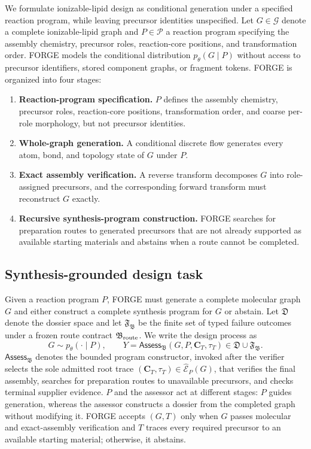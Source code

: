 \documentclass{article}
\begin{document}
We formulate ionizable-lipid design as conditional generation under a specified reaction program,
while leaving precursor identities unspecified.
Let $G\in\mathcal{G}$ denote a complete ionizable-lipid graph and $P\in\mathcal{P}$ a reaction
program specifying the assembly chemistry, precursor roles, reaction-core positions, and
transformation order.
FORGE models the conditional distribution $p_\theta(G\mid P)$ without access to precursor
identifiers, stored component graphs, or fragment tokens.
FORGE is organized into four stages:
\begin{enumerate}
    \item \textbf{Reaction-program specification.}
    $P$ defines the assembly chemistry, precursor roles, reaction-core positions, transformation
    order, and coarse per-role morphology, but not precursor identities.

    \item \textbf{Whole-graph generation.}
    A conditional discrete flow generates every atom, bond, and topology state of $G$ under $P$.

    \item \textbf{Exact assembly verification.}
    A reverse transform decomposes $G$ into role-assigned precursors, and the corresponding forward
    transform must reconstruct $G$ exactly.

    \item \textbf{Recursive synthesis-program construction.}
    FORGE searches for preparation routes to generated precursors that are not already supported as
    available starting materials and abstains when a route cannot be completed.
\end{enumerate}




\subsection{Synthesis-grounded design task}

Given a reaction program $P$, FORGE must generate a complete molecular graph $G$ and either
construct a complete synthesis program for $G$ or abstain.
Let $\mathfrak D$ denote the dossier space and let $\mathfrak F_{\mathfrak B}$ be the finite set of
typed failure outcomes under a frozen route contract $\mathfrak B_{\rm route}$.
We write the design process as
\begin{equation}
    G\sim p_\theta(\cdot\mid P),
    \qquad
    Y=\mathsf{Assess}_{\mathfrak B}(G,P,\mathbf C_T,\tau_T)
    \in\mathfrak D\cup\mathfrak F_{\mathfrak B}.
\end{equation}
$\mathsf{Assess}_{\mathfrak B}$ denotes the bounded program constructor, invoked after the verifier
selects the sole admitted root trace $(\mathbf C_T,\tau_T)\in\widehat{\mathcal E}_P(G)$, that verifies the final
assembly, searches for preparation routes to unavailable precursors, and checks terminal supplier
evidence. $P$ and the assessor act at different stages: $P$ guides generation, whereas the assessor
constructs a dossier from the completed graph without modifying it.
FORGE accepts $(G,T)$ only when $G$ passes molecular and exact-assembly verification and $T$ traces
every required precursor to an available starting material; otherwise, it abstains.
\end{document}
